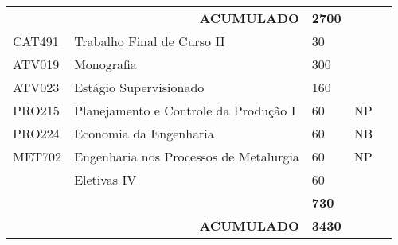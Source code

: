 \begin{table}[]
{\begin{tabular}{l|l|l|l|l}
			\multicolumn{1}{|l|}{}                              & \multicolumn{1}{r|}{\textbf{ACUMULADO}}                  & \textbf{2700}                                                &                         &  \\ \cline{1-4}
			\multicolumn{1}{|l|}{{\color[HTML]{3531FF} CAT491}} & {\color[HTML]{3531FF} Trabalho Final de Curso II}        & {\color[HTML]{3531FF} 30}                                    & {\color[HTML]{3531FF} } &  \\ \cline{1-4}
			\multicolumn{1}{|l|}{{\color[HTML]{3531FF} ATV019}} & {\color[HTML]{3531FF} Monografia}                        & {\color[HTML]{3531FF} 300}                                   & {\color[HTML]{3531FF} } &  \\ \cline{1-4}
			\multicolumn{1}{|l|}{ATV023}                        & {\color[HTML]{6200C9} Estágio Supervisionado}            & {\color[HTML]{6200C9} 160}                                   & {\color[HTML]{6200C9} } &  \\ \cline{1-4}
			\multicolumn{1}{|l|}{PRO215}                        & Planejamento e Controle da Produção I                    & 60                                                           & NP                      &  \\ \cline{1-4}
			\multicolumn{1}{|l|}{PRO224}                        & Economia da Engenharia                                   & 60                                                           & NB                      &  \\ \cline{1-4}
			\multicolumn{1}{|l|}{MET702}                        & Engenharia nos Processos de Metalurgia                   & 60                                                           & NP                      &  \\ \cline{1-4}
			\multicolumn{1}{|l|}{}                              & {\color[HTML]{009901} Eletivas IV}                       & {\color[HTML]{009901} 60}                                    & {\color[HTML]{009901} } &  \\ \cline{1-4}
			\multicolumn{1}{|l|}{}                              &                                                          & \textbf{730}                                                 &                         &  \\ \cline{1-4}
			\multicolumn{1}{|l|}{}                              & \multicolumn{1}{r|}{\textbf{ACUMULADO}}                  & \textbf{3430}                                                &                         &  \\ \cline{1-4}
		\end{tabular}%
	}
\end{table}


